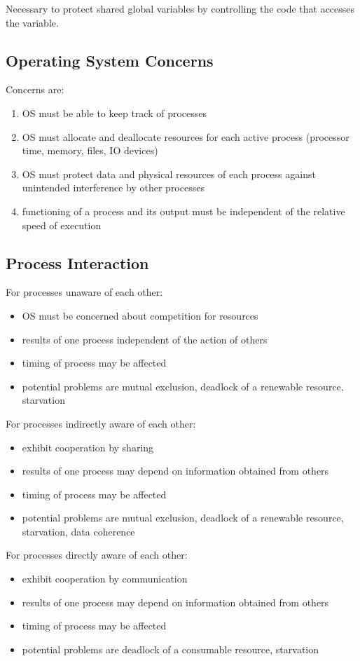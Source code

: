 \documentclass[11pt]{article}
\begin{document}
Necessary to protect shared global variables by
controlling the code that accesses the variable.
\subsection{Operating System Concerns}
\label{sec:orgbec41be}
Concerns are:
\begin{enumerate}
\item OS must be able to keep track of processes
\item OS must allocate and deallocate resources for each
active process (processor time, memory, files,
IO devices)
\item OS must protect data and physical resources of each
process against unintended interference by other
processes
\item functioning of a process and its output must be
independent of the relative speed of execution
\end{enumerate}
\subsection{Process Interaction}
\label{sec:org4f4b492}
For processes unaware of each other:
\begin{itemize}
\item OS must be concerned about competition for resources
\item results of one process independent of the action of others
\item timing of process may be affected
\item potential problems are mutual exclusion, deadlock of
a renewable resource, starvation
\end{itemize}

For processes indirectly aware of each other:
\begin{itemize}
\item exhibit cooperation by sharing
\item results of one process may depend on information obtained
from others
\item timing of process may be affected
\item potential problems are mutual exclusion, deadlock of
a renewable resource, starvation, data coherence
\end{itemize}

For processes directly aware of each other:
\begin{itemize}
\item exhibit cooperation by communication
\item results of one process may depend on information obtained
from others
\item timing of process may be affected
\item potential problems are deadlock of
a consumable resource, starvation
\end{itemize}
\end{document}
